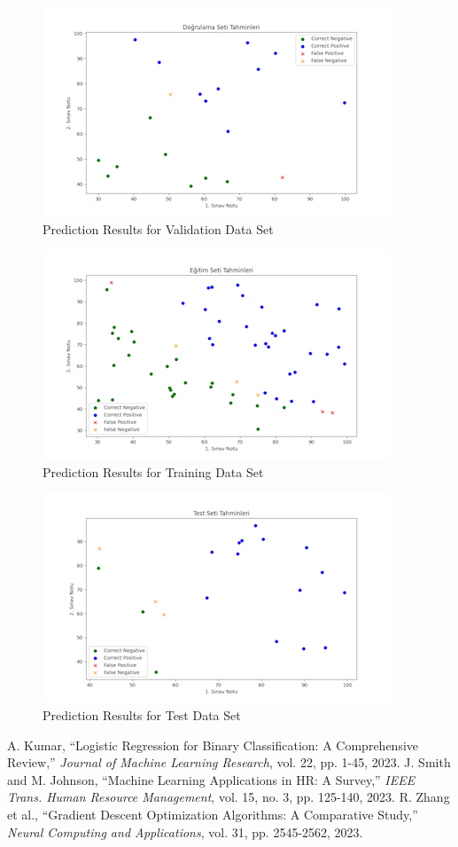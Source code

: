 \documentclass[conference]{IEEEtran}
\begin{document}
\begin{figure}
\centering
\includegraphics{images/validation_predictions.png}
\caption{Prediction Results for Validation Data Set}
\label{fig:validation_predictions}
\end{figure}

\begin{figure}
\centering
\includegraphics{images/egitim_predictions.png}
\caption{Prediction Results for Training Data Set}
\label{fig:training_predictions}
\end{figure}


\begin{figure}
\centering
\includegraphics{images/test_predictions.png}
\caption{Prediction Results for Test Data Set}
\label{fig:test_predictions}
\end{figure}


\begin{thebibliography}{00}
 A. Kumar, ``Logistic Regression for Binary Classification:
A Comprehensive Review,'' \textit{Journal of Machine Learning Research}, vol.
22, pp. 1-45, 2023.
 J. Smith and M. Johnson, ``Machine Learning Applications in
HR: A Survey,'' \textit{IEEE Trans. Human Resource Management}, vol. 15, no. 3,
pp. 125-140, 2023.
 R. Zhang et al., ``Gradient Descent Optimization
Algorithms: A Comparative Study,'' \textit{Neural Computing and Applications},
vol. 31, pp. 2545-2562, 2023.
\end{thebibliography}
\end{document}
